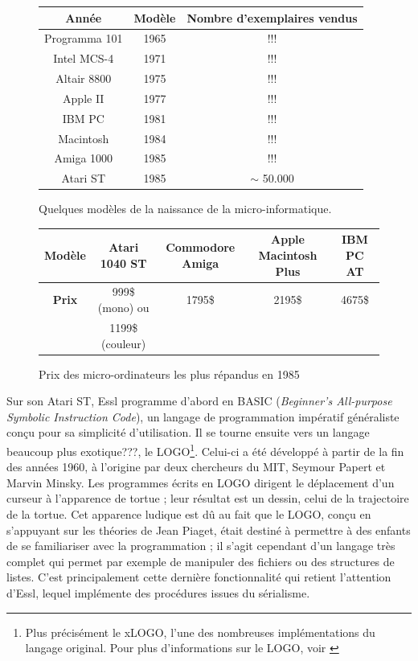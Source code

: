 \documentclass[a4paper,12pt]{article}
\begin{document}
\begin{figure}[h!]
\begin{center}
\begin{tabular}{|c|c|c|}
\hline
\textbf{Année} & \textbf{Modèle} & \textbf{Nombre d'exemplaires vendus} \\
\hline
Programma 101 & 1965 & !!! \\
\hline
Intel MCS-4 & 1971 & !!! \\
\hline
Altair 8800 & 1975 & !!! \\
\hline
Apple II & 1977 & !!! \\
\hline
IBM PC & 1981 & !!! \\ %
\hline
Macintosh & 1984 & !!! \\
\hline
Amiga 1000 & 1985 & !!! \\
\hline
Atari ST & 1985 & $\sim$ 50.000 \\
\hline
\end{tabular}
\caption{Quelques modèles de la naissance de la micro-informatique.}
\label{micropc}
\end{center}
\end{figure}

\begin{figure}[h!]
\begin{center}
\begin{tabular}{|c|c|c|c|c|}
\hline
\textbf{Modèle} & Atari 1040 ST & Commodore Amiga & Apple Macintosh Plus & IBM PC AT \\
\hline
\textbf{Prix} & 999\$ (mono) ou & 1795\$ & 2195\$ & 4675\$ \\
& 1199\$ (couleur) & & & \\
\hline
\end{tabular}
\caption{Prix des micro-ordinateurs les plus répandus en 1985}
\label{prixpc}
\end{center}
\end{figure}

Sur son Atari ST, Essl programme d'abord en BASIC (\emph{Beginner's All-purpose Symbolic Instruction Code}), un langage de programmation impératif généraliste conçu pour sa simplicité d'utilisation. Il se tourne ensuite vers un langage beaucoup plus exotique???, le LOGO\footnote{Plus précisément le xLOGO, l'une des nombreuses implémentations du langage original. Pour plus d'informations sur le LOGO, voir \cite{harvey1985computer}}. Celui-ci a été développé à partir de la fin des années 1960, à l'origine par deux chercheurs du MIT, Seymour Papert et Marvin Minsky. Les programmes écrits en LOGO dirigent le déplacement d'un curseur à l'apparence de tortue ; leur résultat est un dessin, celui de la trajectoire de la tortue. Cet apparence ludique est dû au fait que le LOGO, conçu en s'appuyant sur les théories de Jean Piaget, était destiné à permettre à des enfants de se familiariser avec la programmation ; il s'agit cependant d'un langage très complet qui permet par exemple de manipuler des fichiers ou des structures de listes. C'est principalement cette dernière fonctionnalité qui retient l'attention d'Essl, lequel implémente des procédures issues du sérialisme.
\end{document}
